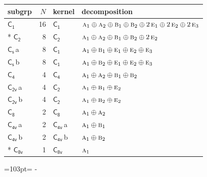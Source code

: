 \documentclass[10pt,a4paper]{article}
\newcommand{\needspace}[1]{\par\penalty-100\begingroup\dimen0=#1\relax\dimen2=\pagegoal
  \advance\dimen2-\pagetotal\ifdim\dimen0>\dimen2\relax\ifdim\dimen2>0pt\vfil\break\fi\fi
  \endgroup}
\numberwithin{equation}{section}
\newcommand{\grp}[1]{\mathsf{#1}}
\newcommand{\irr}[1]{\text{\normalfont\scshape #1}}
\newcommand{\clsletter}[1]{\,{\scriptsize\color{black!55}#1}}
\newlength{\fillwidth}\newlength{\cellwidth}\newlength{\colwidth}
\begin{document}
{\begin{longtable}{@{}lrl>{\RaggedRight\arraybackslash}p{\fillwidth}@{}}
subgrp & $N$ & kernel & decomposition\\\midrule\endhead
\bottomrule\endfoot\endlastfoot
\href{C1.pdf}{$\grp{C_{1}}$} & 16 & \href{C1.pdf}{$\grp{C_{1}}$} & $\irr{a}_{1}\oplus \irr{a}_{2}\oplus \irr{b}_{1}\oplus \irr{b}_{2}\oplus 2\,\irr{e}_{1}\oplus 2\,\irr{e}_{2}\oplus 2\,\irr{e}_{3}$\\*
\href{C2.pdf}{$\grp{C_{2}}$} & 8 & \href{C2.pdf}{$\grp{C_{2}}$} & $\irr{a}_{1}\oplus \irr{a}_{2}\oplus \irr{b}_{1}\oplus \irr{b}_{2}\oplus 2\,\irr{e}_{2}$\\
\href{C1v.pdf}{$\grp{C_{s}}$}\clsletter{a} & 8 & \href{C1.pdf}{$\grp{C_{1}}$} & $\irr{a}_{1}\oplus \irr{b}_{1}\oplus \irr{e}_{1}\oplus \irr{e}_{2}\oplus \irr{e}_{3}$\\
\href{C1v.pdf}{$\grp{C_{s}}$}\clsletter{b} & 8 & \href{C1.pdf}{$\grp{C_{1}}$} & $\irr{a}_{1}\oplus \irr{b}_{2}\oplus \irr{e}_{1}\oplus \irr{e}_{2}\oplus \irr{e}_{3}$\\
\href{C4.pdf}{$\grp{C_{4}}$} & 4 & \href{C4.pdf}{$\grp{C_{4}}$} & $\irr{a}_{1}\oplus \irr{a}_{2}\oplus \irr{b}_{1}\oplus \irr{b}_{2}$\\
\href{C2v.pdf}{$\grp{C_{2v}}$}\clsletter{a} & 4 & \href{C2.pdf}{$\grp{C_{2}}$} & $\irr{a}_{1}\oplus \irr{b}_{1}\oplus \irr{e}_{2}$\\
\href{C2v.pdf}{$\grp{C_{2v}}$}\clsletter{b} & 4 & \href{C2.pdf}{$\grp{C_{2}}$} & $\irr{a}_{1}\oplus \irr{b}_{2}\oplus \irr{e}_{2}$\\
\href{C8.pdf}{$\grp{C_{8}}$} & 2 & \href{C8.pdf}{$\grp{C_{8}}$} & $\irr{a}_{1}\oplus \irr{a}_{2}$\\
\href{C4v.pdf}{$\grp{C_{4v}}$}\clsletter{a} & 2 & \href{C4v.pdf}{$\grp{C_{4v}}$}\clsletter{a} & $\irr{a}_{1}\oplus \irr{b}_{1}$\\
\href{C4v.pdf}{$\grp{C_{4v}}$}\clsletter{b} & 2 & \href{C4v.pdf}{$\grp{C_{4v}}$}\clsletter{b} & $\irr{a}_{1}\oplus \irr{b}_{2}$\\*
\href{C8v.pdf}{$\grp{C_{8v}}$} & 1 & \href{C8v.pdf}{$\grp{C_{8v}}$} & $\irr{a}_{1}$\\
\bottomrule\end{longtable}}
\needspace{103pt}
\end{document}
